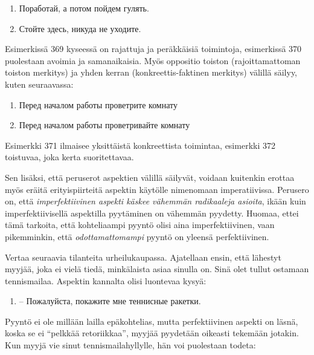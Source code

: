 \documentclass[]{scrreprt}
\providecommand{\tightlist}{%
  \setlength{\itemsep}{0pt}\setlength{\parskip}{0pt}}
\begin{document}
\begin{enumerate}
\def\labelenumi{(\arabic{enumi})}
\setcounter{enumi}{368}
\tightlist
\item
  Поработай, а потом пойдем гулять.
\item
  Стойте здесь, никуда не уходите.
\end{enumerate}

Esimerkissä 369 kyseessä on rajattuja ja peräkkäisiä toimintoja,
esimerkissä 370 puolestaan avoimia ja samanaikaisia. Myös oppositio
toiston (rajoittamattoman toiston merkitys) ja yhden kerran
(konkreettis-faktinen merkitys) välillä säilyy, kuten seuraavassa:

\begin{enumerate}
\def\labelenumi{(\arabic{enumi})}
\setcounter{enumi}{370}
\tightlist
\item
  Перед началом работы проветрите комнату
\item
  Перед началом работы проветривайте комнату
\end{enumerate}

Esimerkki 371 ilmaisee yksittäistä konkreettista toimintaa, esimerkki
372 toistuvaa, joka kerta suoritettavaa.

Sen lisäksi, että peruserot aspektien välillä säilyvät, voidaan
kuitenkin erottaa myös eräitä erityispiirteitä aspektin käytölle
nimenomaan imperatiivissa. Perusero on, että \emph{imperfektiivinen
aspekti käskee vähemmän radikaaleja asioita}, ikään kuin
imperfektiivisellä aspektilla pyytäminen on vähemmän pyydetty. Huomaa,
ettei tämä tarkoita, että kohteliaampi pyyntö olisi aina
imperfektiivinen, vaan pikemminkin, että \emph{odottamattomampi} pyyntö
on yleensä perfektiivinen.

Vertaa seuraavia tilanteita urheilukaupassa. Ajatellaan ensin, että
lähestyt myyjää, joka ei vielä tiedä, minkälaista asiaa sinulla on. Sinä
olet tullut ostamaan tennismailaa. Aspektin kannalta olisi luontevaa
kysyä:

\begin{enumerate}
\def\labelenumi{(\arabic{enumi})}
\setcounter{enumi}{372}
\tightlist
\item
  -- Пожалуйста, покажите мне теннисные ракетки.
\end{enumerate}

Pyyntö ei ole millään lailla epäkohtelias, mutta perfektiivinen aspekti
on läsnä, koska se ei ``pelkkää retoriikkaa'', myyjää pyydetään oikeasti
tekemään jotakin. Kun myyjä vie sinut tennismailahyllylle, hän voi
puolestaan todeta:
\end{document}
